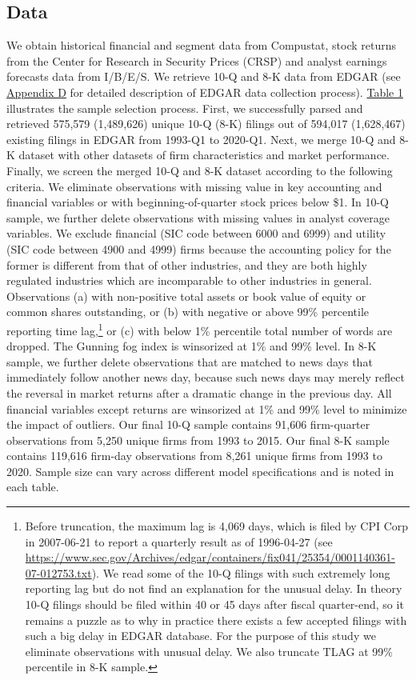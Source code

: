 \documentclass[letterpaper,11pt]{article}
\begin{document}
\begin{spacing}{1.5}
\subsection{Data}
\noindent We obtain historical financial and segment data from Compustat, stock returns from the Center for Research in Security Prices (CRSP) and analyst earnings forecasts data from I/B/E/S. We retrieve 10-Q and 8-K data from EDGAR (see \hyperref[appd]{Appendix D} for detailed description of EDGAR data collection process). \hyperref[T1]{Table 1} illustrates the sample selection process. First, we successfully parsed and retrieved 575,579 (1,489,626) unique 10-Q (8-K) filings out of 594,017 (1,628,467) existing filings in EDGAR from 1993-Q1 to 2020-Q1. Next, we merge 10-Q and 8-K dataset with other datasets of firm characteristics and market performance. Finally, we screen the merged 10-Q and 8-K dataset according to the following criteria. We eliminate observations with missing value in key accounting and financial variables or with beginning-of-quarter stock prices below \$1. In 10-Q sample, we further delete observations with missing values in analyst coverage variables. We exclude financial (SIC code between 6000 and 6999) and utility (SIC code between 4900 and 4999) firms because the accounting policy for the former is different from that of other industries, and they are both highly regulated industries which are incomparable to other industries in general. Observations (a) with non-positive total assets or book value of equity or common shares outstanding, or (b) with negative or above 99\% percentile reporting time lag,\footnote{Before truncation, the maximum lag is 4,069 days, which is filed by CPI Corp in 2007-06-21 to report a quarterly result as of 1996-04-27 (see \url{https://www.sec.gov/Archives/edgar/containers/fix041/25354/0001140361-07-012753.txt}). We read some of the 10-Q filings with such extremely long reporting lag but do not find an explanation for the unusual delay. In theory 10-Q filings should be filed within 40 or 45 days after fiscal quarter-end, so it remains a puzzle as to why in practice there exists a few accepted filings with such a big delay in EDGAR database. For the purpose of this study we eliminate observations with unusual delay. We also truncate TLAG at 99\% percentile in 8-K sample.} or (c) with below 1\% percentile total number of words are dropped. The Gunning fog index is winsorized at 1\% and 99\% level. In 8-K sample, we further delete observations that are matched to news days that immediately follow another news day, because such news days may merely reflect the reversal in market returns after a dramatic change in the previous day. All financial variables except returns are winsorized at 1\% and 99\% level to minimize the impact of outliers. Our final 10-Q sample contains 91,606 firm-quarter observations from 5,250 unique firms from 1993 to 2015. Our final 8-K sample contains 119,616 firm-day observations from 8,261 unique firms from 1993 to 2020. Sample size can vary across different model specifications and is noted in each table. 


\end{spacing}
\end{document}
